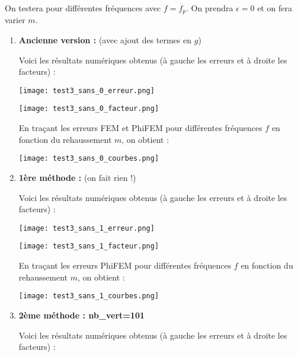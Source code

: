 On testera pour différentes fréquences avec $f=f_p$. On prendra $\epsilon=0$ et on fera varier $m$.

\begin{enumerate}[label=\textbullet]
	\item \textbf{Ancienne version :} (avec ajout des termes en $g$)
	
	Voici les résultats numériques obtenus (à gauche les erreurs et à droite les facteurs) :
	
	\begin{minipage}{0.52\linewidth}
		\centering
		\texttt{[image: test3\_sans\_0\_erreur.png]}
	\end{minipage}
	\begin{minipage}{0.44\linewidth}
		\centering
		\texttt{[image: test3\_sans\_0\_facteur.png]}
	\end{minipage}
	
	En traçant les erreurs FEM et PhiFEM pour différentes fréquences $f$ en fonction du rehaussement $m$, on obtient :
	
	\begin{minipage}{\linewidth}
		\centering
		\texttt{[image: test3\_sans\_0\_courbes.png]}
	\end{minipage}

	\item \textbf{1ère méthode :} (on fait rien !)
	
	Voici les résultats numériques obtenus (à gauche les erreurs et à droite les facteurs) :
	
	\begin{minipage}{0.48\linewidth}
		\centering
		\texttt{[image: test3\_sans\_1\_erreur.png]}
	\end{minipage}
	\begin{minipage}{0.48\linewidth}
		\centering
		\texttt{[image: test3\_sans\_1\_facteur.png]}
	\end{minipage}
	
	En traçant les erreurs PhiFEM pour différentes fréquences $f$ en fonction du rehaussement $m$, on obtient :
	
	\begin{minipage}{\linewidth}
		\centering
		\texttt{[image: test3\_sans\_1\_courbes.png]}
	\end{minipage}
	
	\item \textbf{2ème méthode : nb\_vert=101}
	
	Voici les résultats numériques obtenus (à gauche les erreurs et à droite les facteurs) :
	

\end{enumerate}
